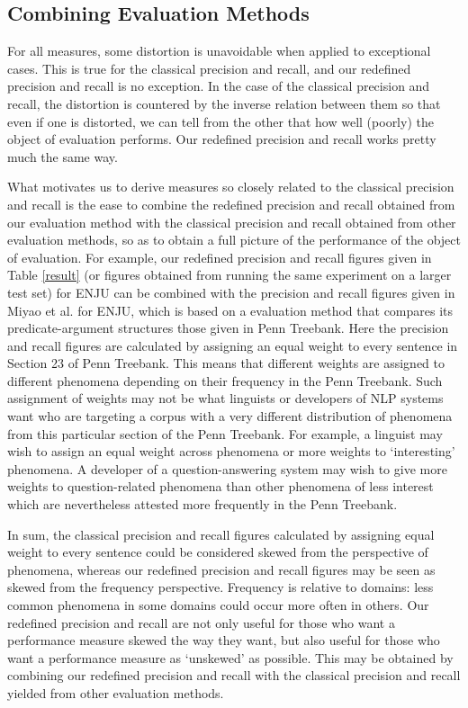 \documentclass[11pt]{article}
\begin{document}
\subsection{Combining Evaluation Methods}

For all measures, some distortion is unavoidable when applied to exceptional cases. This is true for the classical precision and recall, and our redefined precision and recall is no exception. In the case of the classical precision and recall, the distortion is countered by the inverse relation between them so that even if one is distorted, we can tell from the other that how well (poorly) the object of evaluation performs. Our redefined precision and recall works pretty much the same way. 

What motivates us to derive measures so closely related to the classical precision and recall is the ease to combine the redefined precision and recall obtained from our evaluation method with the classical precision and recall obtained from other evaluation methods, so as to obtain a full picture of the performance of the object of evaluation. For example, our redefined precision and recall figures given in Table \ref{result} (or figures obtained from running the same experiment on a larger test set)  for ENJU can be combined with the precision and recall figures given in Miyao et al.  for ENJU, which is based on a evaluation method that compares its predicate-argument structures those given in Penn Treebank. Here the precision and recall figures are calculated by assigning an equal weight to every sentence in Section 23 of Penn Treebank. This means that different weights are assigned to different phenomena depending on their frequency in the Penn Treebank. Such assignment of weights may not be what linguists or developers of NLP systems want who are targeting a corpus with a very different distribution of phenomena from this particular section of the Penn Treebank. For example, a linguist may wish to assign an equal weight across phenomena or more weights to `interesting' phenomena. A developer of a question-answering system may wish to give more weights to question-related phenomena than other phenomena of less interest which are nevertheless attested more frequently in the Penn Treebank. 

In sum, the classical precision and recall figures calculated by assigning equal weight to every sentence could be considered skewed from the perspective of phenomena, whereas our redefined precision and recall figures may be seen as skewed from the frequency perspective. Frequency is relative to domains: less common phenomena in some domains could occur more often in others. Our redefined precision and recall are not only useful for those who want a performance measure skewed the way they want, but also useful for those who want a performance measure as `unskewed' as possible. This may be obtained by combining our redefined precision and recall with the classical precision and recall yielded from other evaluation methods.
\end{document}
